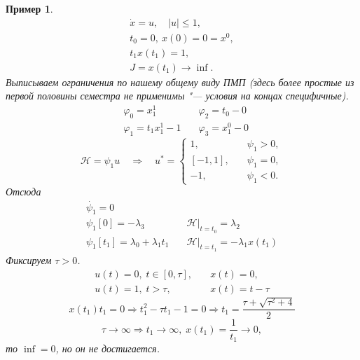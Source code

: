 \documentclass[12pt, a4paper]{article}
\theoremstyle{rusdef}
\newtheorem{example}{Пример}
\renewcommand{\H}{\mathcal{H}} %
\DeclareMathOperator*{\thus}{\Rightarrow} %
\begin{document}
\begin{example}
  \begin{gather*}
    \dot{x} = u, \quad |u| \leqslant 1, \\
    t_0 = 0, \: x(0) = 0 = x^0, \\
    t_1 x(t_1) = 1, \\
    J = x(t_1) \to \inf.
  \end{gather*}
  Выписываем ограничения по нашему общему виду ПМП (здесь более простые из первой половины семестра не применимы "--- условия на концах специфичные).
  \[
    \begin{matrix}
      &\varphi_0 = x^1_1         &\quad \varphi_2 = t_0 - 0 \\
      &\varphi_1 = t_1 x^1_1 - 1 &\quad \varphi_3 = x^0_1 - 0
    \end{matrix}
  \]
  \[
    \H = \psi_1 u \quad \thus \quad
    u^* =
    \left\{
      \begin{aligned}
        1, &\quad \psi_1 > 0, \\
        [-1, 1], &\quad \psi_1 = 0, \\
        -1, &\quad \psi_1 < 0.
      \end{aligned}
    \right.
  \]
  Отсюда
  \[
    \begin{matrix}
      \dot{\psi_1} = 0 \\
      \psi_1[0] = - \lambda_3 &\quad \H \vert_{t = t_0} = \lambda_2 \\
      \psi_1[t_1] = \lambda_0 + \lambda_1 t_1 &\quad \H \vert_{t = t_1} = -\lambda_1 x(t_1)
    \end{matrix}
  \]
  Фиксируем $\tau > 0$.
  \[
    \begin{matrix}
      u(t) = 0, \; t \in [0, \tau], &\quad x(t) = 0, \\
      u(t) = 1, \; t > \tau, &\quad x(t) = t - \tau
    \end{matrix}
  \]
  \[
    x(t_1) t_1 = 0 \thus t_1^2 - \tau t_1 - 1 = 0 \thus t_1 = \dfrac{\tau + \sqrt{\tau^2 + 4}}{2}
  \]
  \[
    \tau \to \infty \thus t_1 \to \infty, \; x(t_1) = \dfrac{1}{t_1} \to 0,
  \]
  то $\inf = 0$, но он не достигается.
\end{example}
\end{document}
